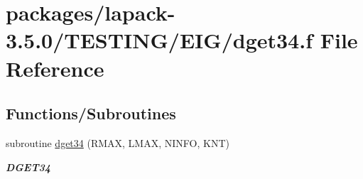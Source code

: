 \hypertarget{dget34_8f}{}\section{packages/lapack-\/3.5.0/\+T\+E\+S\+T\+I\+N\+G/\+E\+I\+G/dget34.f File Reference}
\label{dget34_8f}
\subsection*{Functions/\+Subroutines}
\begin{DoxyCompactItemize}
\item 
subroutine \hyperlink{group__double__eig_gac5920e80cf7499fc8cdb1c71f4e97ad3}{dget34} (R\+M\+A\+X, L\+M\+A\+X, N\+I\+N\+F\+O, K\+N\+T)
\begin{DoxyCompactList}\small\item\em {\bfseries D\+G\+E\+T34} \end{DoxyCompactList}\end{DoxyCompactItemize}
